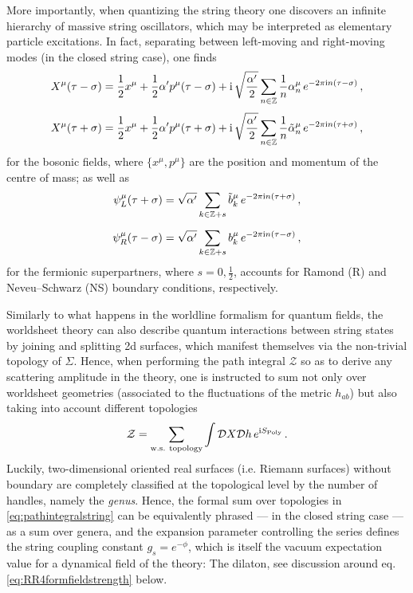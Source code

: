 More importantly, when quantizing the string theory one discovers an infinite hierarchy of massive string oscillators, which may be interpreted as elementary particle excitations. In fact, separating between left-moving and right-moving modes (in the closed string case), one finds
%
\begin{subequations}\label{eq:modeexpansionclosedstring}
	\begin{align}
		X^\mu (\tau-\sigma)& = \frac12 x^{\mu} + \frac12 \alpha' p^{\mu} (\tau-\sigma) + \text{i}\, \sqrt{\frac{\alpha'}{2}} \sum_{n\in \mathbb{Z}} \frac{1}{n} \alpha^\mu_n \, e^{-2\pi \text{i} n (\tau-\sigma)} \,, \\[1mm]
		X^\mu (\tau+\sigma) & = \frac12 x^{\mu} + \frac12 \alpha' p^{\mu} (\tau+\sigma) + \text{i}\, \sqrt{\frac{\alpha'}{2}} \sum_{n\in \mathbb{Z}} \frac{1}{n} \tilde{\alpha}^\mu_n \, e^{-2\pi \text{i} n (\tau+\sigma)} \,, 
	\end{align}
\end{subequations}
%
for the bosonic fields, where $\{x^\mu, p^{\mu} \}$ are the position and momentum of the centre of mass; as well as 
%
\begin{subequations}\label{eq:fermionmodeexpansionstrings}
	\begin{align}
		\psi^\mu_L (\tau+\sigma) & = \sqrt{\alpha'} \sum_{k \in \mathbb{Z} + s} \tilde{b}^\mu_k\, e^{-2\pi \text{i} n (\tau+\sigma)} \,, \\[2mm]
		\psi^\mu_R (\tau-\sigma) & = \sqrt{\alpha'} 	\sum_{k \in \mathbb{Z} + s} {b}^\mu_k\, e^{-2\pi \text{i} n (\tau-\sigma)} \,,
	\end{align}
\end{subequations}	
%
for the fermionic superpartners, where $s = 0, \frac12$, accounts for Ramond (R) and Neveu--Schwarz (NS) boundary conditions, respectively.

Similarly to what happens in the worldline formalism for quantum fields, the worldsheet theory can also describe quantum interactions between string states by joining and splitting 2d surfaces, which manifest themselves via the non-trivial topology of $\Sigma$. Hence, when performing the path integral $\mathcal{Z}$ so as to derive any scattering amplitude in the theory, one is instructed to sum not only over worldsheet geometries (associated to the fluctuations of the metric $h_{ab}$) but also taking into account different topologies
%
\begin{align}\label{eq:pathintegralstring}
    \mathcal{Z}= \sum_{\rm w.s.\ topology} \int \mathcal{D}X \mathcal{D}h\, e^{ \text{i} S_{\rm Poly}}\, .
\end{align}
%
Luckily, two-dimensional oriented real surfaces (i.e. Riemann surfaces) without boundary are completely classified at the topological level by the number of handles, namely the \emph{genus}. Hence, the formal sum over topologies in \eqref{eq:pathintegralstring} can be equivalently phrased --- in the closed string case --- as a sum over genera, and the expansion parameter controlling the series defines the string coupling constant $g_s = e^{-\phi}$, which is itself the vacuum expectation value for a dynamical field of the theory: The dilaton, see discussion around eq. \eqref{eq:RR4formfieldstrength} below.

